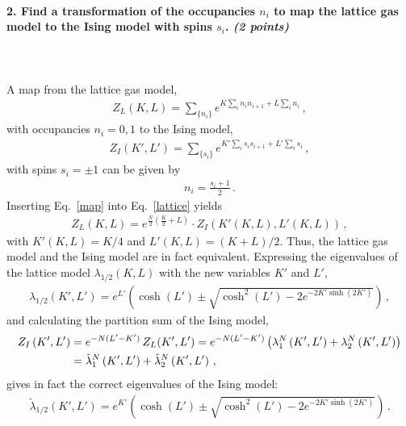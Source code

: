 \paragraph{2. Find a transformation of the 
    occupancies $n_i$ to map the lattice gas 
    model to the Ising model with spins $s_i$. 
    \textit{(2 points)}
} \ \\
\\
A map from the lattice gas model,
\begin{align}
	\label{lattice}
	Z_L(K,L) = \sum_{\{n_i\}} 
	e^{K\sum_i n_i n_{i+1}+L \sum_i n_i} \,,
\end{align}
with occupancies $n_i=0,1$ to the Ising model,
\begin{align}
	\label{ising}
	Z_I(K',L') = \sum_{\{s_i\}} 
	e^{K'\sum_i s_i s_{i+1}+L' \sum_i s_i} \,,
\end{align}
with spins $s_i=\pm 1$ can be given by
\begin{align}
	\label{map}
	n_i = \frac{s_i + 1}{2} \,.
\end{align}
Inserting Eq.~\eqref{map} into Eq.~\eqref{lattice} yields
\begin{align}
	Z_L(K,L) = e^{\frac{N}{2}(\frac{K}{2} + L)} \cdot
	Z_I\left(K'(K,L),L'(K,L)\right) \,,
\end{align}
with $K'(K,L) = K/4$ and $L'(K,L)=(K+L)/2$. Thus, 
the lattice gas model and the Ising model are in fact 
equivalent. Expressing the eigenvalues of the lattice 
model $\lambda_{1/2}(K,L)$ with the new variables 
$K'$ and $L'$, 
\begin{align}
	\lambda_{1/2}\left(K',L'\right) = 
	e^{L'}\left(\cosh(L')\pm\sqrt{\cosh^2(L')-2e^{-2K'\sinh(2K')}}\right) \,,
\end{align}
and calculating the partition sum of the Ising model,
\begin{align}
	Z_I\left(K',L'\right) &= e^{-N(L'-K')} \, Z_L(K',L') 
	= e^{-N(L'-K')} \left(\lambda_1^N\left(K',L'\right)+\lambda_2^N\left(K',L'\right)\right) \notag \\
	&= \tilde{\lambda}_1^N\left(K',L'\right) + \tilde{\lambda}_2^N\left(K',L'\right) \,,
\end{align}
gives in fact the correct eigenvalues of the Ising model:
\begin{align}
	\tilde{\lambda}_{1/2}\left(K',L'\right) = 
	e^{K'}\left(\cosh(L')\pm\sqrt{\cosh^2(L')-2e^{-2K'\sinh(2K')}}\right) \,.
\end{align}


